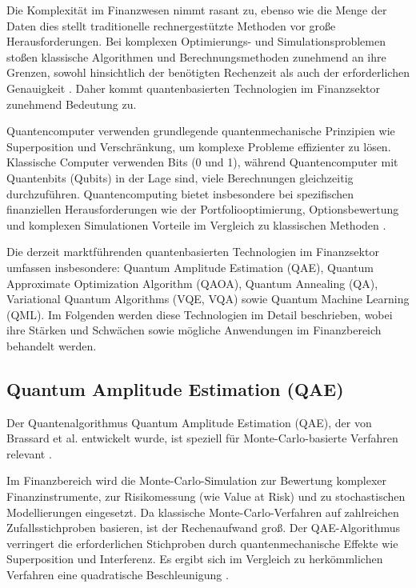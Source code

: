 Die Komplexität im Finanzwesen nimmt rasant zu, ebenso wie die Menge der Daten   dies stellt traditionelle rechnergestützte Methoden vor große Herausforderungen. Bei komplexen Optimierungs- und Simulationsproblemen stoßen klassische Algorithmen und Berechnungsmethoden zunehmend an ihre Grenzen, sowohl hinsichtlich der benötigten Rechenzeit als auch der erforderlichen Genauigkeit \cite{plos2024,bouland2020}. Daher kommt quantenbasierten Technologien im Finanzsektor zunehmend Bedeutung zu.

Quantencomputer verwenden grundlegende quantenmechanische Prinzipien wie Superposition und Verschränkung, um komplexe Probleme effizienter zu lösen. Klassische Computer verwenden Bits (0 und 1), während Quantencomputer mit Quantenbits (Qubits) in der Lage sind, viele Berechnungen gleichzeitig durchzuführen. Quantencomputing bietet insbesondere bei spezifischen finanziellen Herausforderungen wie der Portfoliooptimierung, Optionsbewertung und komplexen Simulationen Vorteile im Vergleich zu klassischen Methoden \cite{orus2019,bouland2020,martin2022}.

Die derzeit marktführenden quantenbasierten Technologien im Finanzsektor umfassen insbesondere:
Quantum Amplitude Estimation (QAE), Quantum Approximate Optimization Algorithm (QAOA), Quantum Annealing (QA), Variational Quantum Algorithms (VQE, VQA) sowie Quantum Machine Learning (QML). Im Folgenden werden diese Technologien im Detail beschrieben, wobei ihre Stärken und Schwächen sowie mögliche Anwendungen im Finanzbereich behandelt werden.





\subsection{Quantum Amplitude Estimation (QAE)}

Der Quantenalgorithmus Quantum Amplitude Estimation (QAE), der von Brassard et al. entwickelt wurde, ist speziell für Monte-Carlo-basierte Verfahren relevant \cite{quantumjournal2020,rebentrost2018}.

Im Finanzbereich wird die Monte-Carlo-Simulation zur Bewertung komplexer Finanzinstrumente, zur Risikomessung (wie Value at Risk) und zu stochastischen Modellierungen eingesetzt. Da klassische Monte-Carlo-Verfahren auf zahlreichen Zufallsstichproben basieren, ist der Rechenaufwand groß. Der QAE-Algorithmus verringert die erforderlichen Stichproben durch quantenmechanische Effekte wie Superposition und Interferenz. Es ergibt sich im Vergleich zu herkömmlichen Verfahren eine quadratische Beschleunigung \cite{quantumjournal2020,rebentrost2018,martin2022}.

